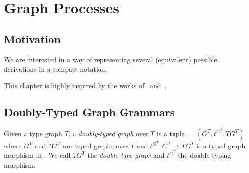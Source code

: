 \chapter{Graph Processes}

\section{Motivation}

We are interested in a way of representing several (equivalent) possible derivations in a compact notation.

  This chapter is highly inspired by the works of~\cite{Ribeiro1996} and~\cite{Corradini1996}.

\section{Doubly-Typed Graph Grammars}

\begin{definition} Given a type graph $T$, a \emph{doubly-typed graph} \doublyTypedGraph{} over $T$ is a tuple \doublyTypedGraph $= \left(G^T, t^{G^T},TG^T\right)$ where $G^T$ and $TG^T$ are typed graphs over $T$ and \mbox{$t^{G^T} : G^T \rightarrow TG^T$} is a typed graph morphism in \typedGraphCategory{}. We call $TG^T$ the \emph{double-type graph} and $t^{G^T}$ the double-typing morphism.

\end{definition}


